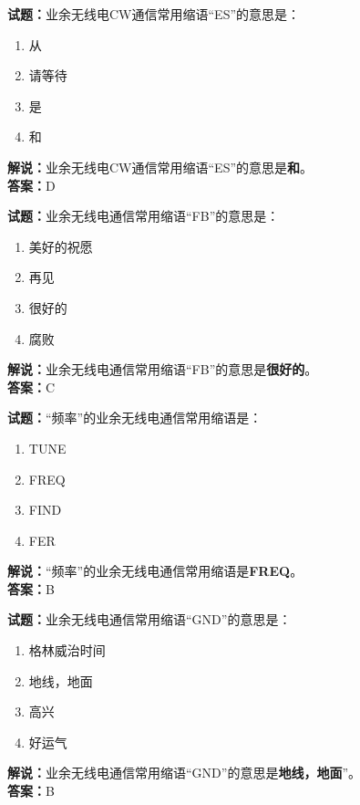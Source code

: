 \documentclass{ctexbook}
\begin{document}
\vspace{1em}

\textbf{试题：}业余无线电CW通信常用缩语“ES”的意思是：
\begin{enumerate}[leftmargin=3em]
  \item 从
  \item 请等待
  \item 是
  \item 和
\end{enumerate}
\noindent\textbf{解说：}业余无线电CW通信常用缩语“ES”的意思是\textbf{和}。\\\noindent\textbf{答案：}D

\vspace{1em}

\textbf{试题：}业余无线电通信常用缩语“FB”的意思是：
\begin{enumerate}[leftmargin=3em]
  \item 美好的祝愿
  \item 再见
  \item 很好的
  \item 腐败
\end{enumerate}
\noindent\textbf{解说：}业余无线电通信常用缩语“FB”的意思是\textbf{很好的}。\\\noindent\textbf{答案：}C

\vspace{1em}

\textbf{试题：}“频率”的业余无线电通信常用缩语是：
\begin{enumerate}[leftmargin=3em]
  \item TUNE
  \item FREQ
  \item FIND
  \item FER
\end{enumerate}
\noindent\textbf{解说：}“频率”的业余无线电通信常用缩语是\textbf{FREQ}。\\\noindent\textbf{答案：}B

\vspace{1em}

\textbf{试题：}业余无线电通信常用缩语“GND”的意思是：
\begin{enumerate}[leftmargin=3em]
  \item 格林威治时间
  \item 地线，地面
  \item 高兴
  \item 好运气
\end{enumerate}
\noindent\textbf{解说：}业余无线电通信常用缩语“GND”的意思是\textbf{地线，地面}”。\\\noindent\textbf{答案：}B
\end{document}
